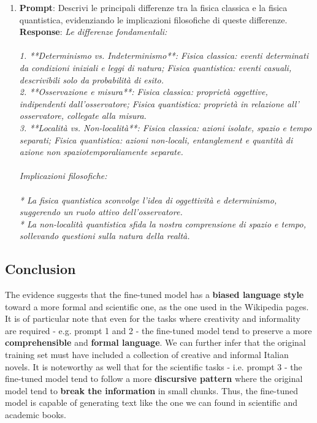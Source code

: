 \documentclass{article}
\begin{document}
\begin{enumerate}
		\item 
		\textbf{Prompt}: Descrivi le principali differenze tra la fisica classica e la fisica quantistica, evidenziando le implicazioni filosofiche di queste differenze.\\
		\textbf{Response}: \textit{Le differenze fondamentali:\\\\1. **Determinismo vs. Indeterminismo**: Fisica classica: eventi determinati da condizioni iniziali e leggi di natura; Fisica quantistica: eventi casuali, descrivibili solo da probabilità di esito.\\2. **Osservazione e misura**: Fisica classica: proprietà oggettive, indipendenti dall'osservatore; Fisica quantistica: proprietà in relazione all' osservatore, collegate alla misura.\\3. **Località vs. Non-località**: Fisica classica: azioni isolate, spazio e tempo separati; Fisica quantistica: azioni non-locali, entanglement e quantità di azione non spaziotemporaliamente separate.\\\\Implicazioni filosofiche:\\\\* La fisica quantistica sconvolge l'idea di oggettività e determinismo, suggerendo un ruolo attivo dell'osservatore.\\* La non-località quantistica sfida la nostra comprensione di spazio e tempo, sollevando questioni sulla natura della realtà.}
		
	\end{enumerate}

	\subsection{Conclusion}
	The evidence suggests that the fine-tuned model has a \textbf{biased language style} toward a more formal and scientific one, as the one used in the Wikipedia pages. It is of particular note that even for the tasks where creativity and informality are required - e.g. prompt 1 and 2 - the fine-tuned model tend to preserve a more \textbf{comprehensible} and \textbf{formal language}. 
	We can further infer that the original training set must have included a collection of creative and informal Italian novels.
	It is noteworthy as well that for the scientific tasks - i.e. prompt 3 - the fine-tuned model tend to follow a more \textbf{discursive pattern} where the original model tend to \textbf{break the information} in small chunks. 
	Thus, the fine-tuned model is capable of generating text like the one we can found in scientific and academic books. 	
	
\end{document}
